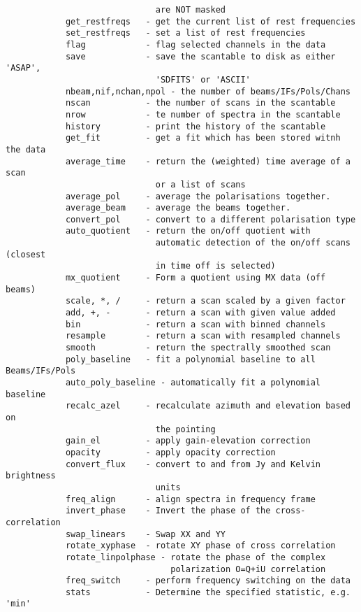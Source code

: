 \documentclass[11pt]{article}
\begin{document}
\begin{verbatim}
                              are NOT masked
            get_restfreqs   - get the current list of rest frequencies
            set_restfreqs   - set a list of rest frequencies
            flag            - flag selected channels in the data
            save            - save the scantable to disk as either 'ASAP',
                              'SDFITS' or 'ASCII'
            nbeam,nif,nchan,npol - the number of beams/IFs/Pols/Chans
            nscan           - the number of scans in the scantable
            nrow            - te number of spectra in the scantable
            history         - print the history of the scantable
            get_fit         - get a fit which has been stored witnh the data
            average_time    - return the (weighted) time average of a scan
                              or a list of scans
            average_pol     - average the polarisations together.
            average_beam    - average the beams together.
            convert_pol     - convert to a different polarisation type
            auto_quotient   - return the on/off quotient with
                              automatic detection of the on/off scans (closest
                              in time off is selected)
            mx_quotient     - Form a quotient using MX data (off beams)
            scale, *, /     - return a scan scaled by a given factor
            add, +, -       - return a scan with given value added
            bin             - return a scan with binned channels
            resample        - return a scan with resampled channels
            smooth          - return the spectrally smoothed scan
            poly_baseline   - fit a polynomial baseline to all Beams/IFs/Pols
            auto_poly_baseline - automatically fit a polynomial baseline
            recalc_azel     - recalculate azimuth and elevation based on
                              the pointing
            gain_el         - apply gain-elevation correction
            opacity         - apply opacity correction
            convert_flux    - convert to and from Jy and Kelvin brightness
                              units
            freq_align      - align spectra in frequency frame
            invert_phase    - Invert the phase of the cross-correlation
            swap_linears    - Swap XX and YY
            rotate_xyphase  - rotate XY phase of cross correlation
            rotate_linpolphase - rotate the phase of the complex
                                 polarization O=Q+iU correlation
            freq_switch     - perform frequency switching on the data
            stats           - Determine the specified statistic, e.g. 'min'

\end{verbatim}
\end{document}
